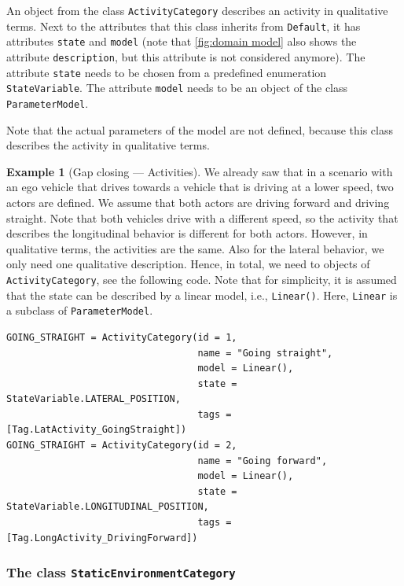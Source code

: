 \documentclass[10pt,final,a4paper,oneside,onecolumn]{article}
\theoremstyle{plain}\newtheorem{definition}{Definition}[section]    %
\theoremstyle{definition}\newtheorem{example}{Example}[section]     %
\theoremstyle{remark}\newtheorem{remarkenv}{Remark}[section]        %
\begin{document}
An object from the class \texttt{ActivityCategory} describes an activity in qualitative terms. Next to the attributes that this class inherits from \texttt{Default}, it has attributes \texttt{state} and \texttt{model} (note that \cref{fig:domain model} also shows the attribute \texttt{description}, but this attribute is not considered anymore). The attribute \texttt{state} needs to be chosen from a predefined enumeration \texttt{StateVariable}. The attribute \texttt{model} needs to be an object of the class \texttt{ParameterModel}.

Note that the actual parameters of the model are not defined, because this class describes the activity in qualitative terms. 

\begin{example}[Gap closing --- Activities] \label{example:activity category}
	We already saw that in a scenario with an ego vehicle that drives towards a vehicle that is driving at a lower speed, two actors are defined. We assume that both actors are driving forward and driving straight. Note that both vehicles drive with a different speed, so the activity that describes the longitudinal behavior is different for both actors. However, in qualitative terms, the activities are the same. Also for the lateral behavior, we only need one qualitative description. Hence, in total, we need to objects of \texttt{ActivityCategory}, see the following code. Note that for simplicity, it is assumed that the state can be described by a linear model, i.e., \texttt{Linear()}. Here, \texttt{Linear} is a subclass of \texttt{ParameterModel}. 
	
	\begin{lstlisting}[caption=Code for instantiating two objects of \texttt{ActivityCategory}.]
GOING_STRAIGHT = ActivityCategory(id = 1,
                                  name = "Going straight",
                                  model = Linear(), 
                                  state = StateVariable.LATERAL_POSITION,
                                  tags = [Tag.LatActivity_GoingStraight])
GOING_STRAIGHT = ActivityCategory(id = 2,
                                  name = "Going forward",
                                  model = Linear(), 
                                  state = StateVariable.LONGITUDINAL_POSITION,
                                  tags = [Tag.LongActivity_DrivingForward])
	\end{lstlisting}
\end{example}

\subsubsection{The class \texttt{StaticEnvironmentCategory}}
\label{sec:static environment category}
\end{document}
